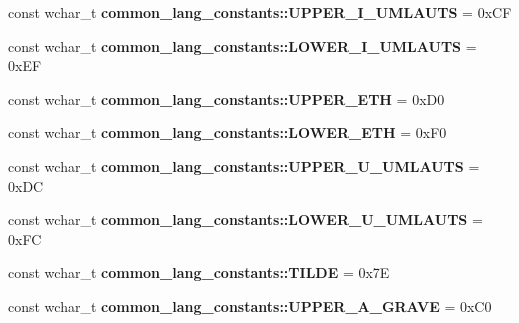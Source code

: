 \begin{DoxyCompactItemize}
\item 
\hypertarget{group___indexing_ga0a620569e2cf93084d20418c9aa894db}{const wchar\-\_\-t {\bfseries common\-\_\-lang\-\_\-constants\-::\-U\-P\-P\-E\-R\-\_\-\-I\-\_\-\-U\-M\-L\-A\-U\-T\-S} = 0x\-C\-F}\label{group___indexing_ga0a620569e2cf93084d20418c9aa894db}

\item 
\hypertarget{group___indexing_gac15a4b365a989e2c2c293fb6eedd84cf}{const wchar\-\_\-t {\bfseries common\-\_\-lang\-\_\-constants\-::\-L\-O\-W\-E\-R\-\_\-\-I\-\_\-\-U\-M\-L\-A\-U\-T\-S} = 0x\-E\-F}\label{group___indexing_gac15a4b365a989e2c2c293fb6eedd84cf}

\item 
\hypertarget{group___indexing_gabadd93d486736ae58738aaa0451a4fb2}{const wchar\-\_\-t {\bfseries common\-\_\-lang\-\_\-constants\-::\-U\-P\-P\-E\-R\-\_\-\-E\-T\-H} = 0x\-D0}\label{group___indexing_gabadd93d486736ae58738aaa0451a4fb2}

\item 
\hypertarget{group___indexing_ga3f93efe1f9bf5cb826df68c106565881}{const wchar\-\_\-t {\bfseries common\-\_\-lang\-\_\-constants\-::\-L\-O\-W\-E\-R\-\_\-\-E\-T\-H} = 0x\-F0}\label{group___indexing_ga3f93efe1f9bf5cb826df68c106565881}

\item 
\hypertarget{group___indexing_gaae9d0af66284aa09ada195ccd40d960c}{const wchar\-\_\-t {\bfseries common\-\_\-lang\-\_\-constants\-::\-U\-P\-P\-E\-R\-\_\-\-U\-\_\-\-U\-M\-L\-A\-U\-T\-S} = 0x\-D\-C}\label{group___indexing_gaae9d0af66284aa09ada195ccd40d960c}

\item 
\hypertarget{group___indexing_ga96b79561e32ed393418b5d21ce0f3fad}{const wchar\-\_\-t {\bfseries common\-\_\-lang\-\_\-constants\-::\-L\-O\-W\-E\-R\-\_\-\-U\-\_\-\-U\-M\-L\-A\-U\-T\-S} = 0x\-F\-C}\label{group___indexing_ga96b79561e32ed393418b5d21ce0f3fad}

\item 
\hypertarget{group___indexing_ga1602d4f3afaafb87cfc706ae0fc72bce}{const wchar\-\_\-t {\bfseries common\-\_\-lang\-\_\-constants\-::\-T\-I\-L\-D\-E} = 0x7\-E}\label{group___indexing_ga1602d4f3afaafb87cfc706ae0fc72bce}

\item 
\hypertarget{group___indexing_ga8c401d2c95f1613f3028c30c9c3dd920}{const wchar\-\_\-t {\bfseries common\-\_\-lang\-\_\-constants\-::\-U\-P\-P\-E\-R\-\_\-\-A\-\_\-\-G\-R\-A\-V\-E} = 0x\-C0}\label{group___indexing_ga8c401d2c95f1613f3028c30c9c3dd920}


\end{DoxyCompactItemize}
